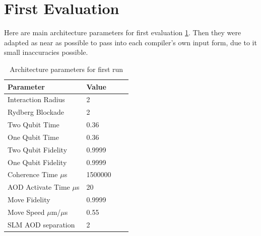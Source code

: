 \section{First Evaluation}
Here are main architecture parameters for first evaluation \ref{tab:architecture_first}. 
Then they were  adapted as near as possible to pass into each compiler's own input form, due to it small inaccuracies possible.
\begin{table}[htpb]
  \caption[Architecture First Run]{Architecture parameters for first run}\label{tab:architecture_first}
  \centering
  \begin{tabular}{l l l l}
    \toprule
      Parameter & Value \\
    \midrule
      Interaction Radius & 2 \\
      Rydberg Blockade & 2 \\
      Two Qubit Time & 0.36 \\
      One Qubit Time & 0.36 \\
      Two Qubit Fidelity & 0.9999 \\
      One Qubit Fidelity & 0.9999 \\
      Coherence Time $\mu$s & 1500000 \\
      AOD Activate Time $\mu$s & 20 \\
      Move Fidelity  & 0.9999 \\
      Move Speed $\mu$m/$\mu$s & 0.55 \\
      SLM AOD separation & 2\\
    \bottomrule
  \end{tabular}
\end{table}

